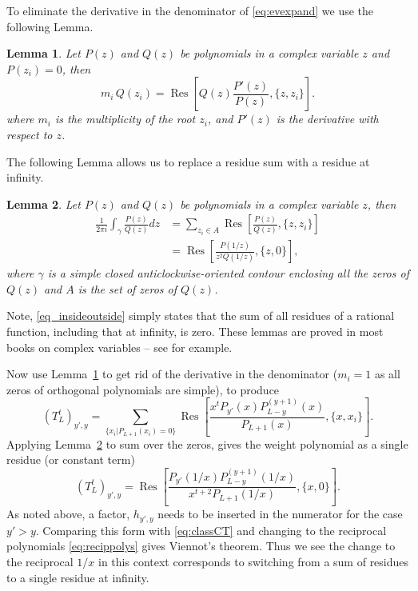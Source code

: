 \documentclass[11pt,a4paper]{article}
\DeclareMathOperator{\res}{\text{Res}}
\newtheorem{lemma}{Lemma}[section]
\begin{document}
To eliminate the derivative in the denominator of \eqref{eq:evexpand} we use the following Lemma.
\begin{lemma}  
\label{lem:asdasd}
Let $P(z)$ and $Q(z)$ be  polynomials in a complex variable $z$ and  $P(z_i)=0$, then 
\begin{equation}
	m_i\,	Q(z_i)= \res \left [ Q(z) \frac{P'(z)}{P(z)}, \{z, z_i\}\right ].
		\label{eq_zeroToRez}
\end{equation}
where $m_i$ is the multiplicity of the root $z_i$, and $P'(z)$ is the derivative with respect to $z$.
\end{lemma} 
%
The following Lemma allows us to replace a residue sum with a residue at infinity.
\begin{lemma}  
\label{lem:insideoutside}
Let $P(z)$ and $Q(z)$ be  polynomials in a complex variable $z$, then
\begin{subequations}
\begin{align}
	\frac{1}{2\pi i }\int_\gamma \frac{P(z)}{Q(z)}dz	&=	\sum_{z_i \in A} \res \left [ \frac{P(z)}{Q(z)}, \{z, z_i \}\right ]\\
		&=	 \res \left [\frac{P(1/z)}{z^2Q(1/z)}, \{z, 0\}\right ],
\end{align}		
\label{eq_insideoutside}
\end{subequations}
where $\gamma$ is a simple closed anticlockwise-oriented contour enclosing all the  zeros of $Q(z)$ and $A$ is the set of zeros of $Q(z)$. 
\end{lemma} 
%

Note, \eqref{eq_insideoutside} simply states that the sum of all residues of a rational function, including that at infinity, is zero.  These lemmas are proved in most books on complex variables -- see \cite{boas:1987lq} for example.


Now use Lemma~\ref{lem:asdasd} to get rid of the derivative in the denominator ($m_i=1$ as all zeros of orthogonal polynomials are simple), to produce
\begin{equation} 
(T_L^t)_{y',y} = \sum_{\{x_i |P_{L+1}(x_i)=0 \}} \res \left [ \frac{x^t P_{y'}(x)P^{(y+1)}_{L-y}(x)}{P_{L+1}(x)} , \{x, x_i\} \right].  
\end{equation}
Applying Lemma~\ref{lem:insideoutside}  to sum over the zeros, gives the weight polynomial as a single residue (or constant term)
\begin{equation}\label{eq:tmtxpower}
(T_L^t)_{y',y} = \res \left [ \frac{P_{y'}(1/x)P^{(y+1)}_{L-y}(1/x)}{x^{t+2}P_{L+1}(1/x)} , \{x, 0\} \right].
\end{equation}
As noted above, a factor, $h_{y',y}$ needs to be inserted in the numerator for the case $y'>y$. Comparing this form with \eqref{eq:classCT} and changing to the reciprocal polynomials \eqref{eq:recippolys} gives  Viennot's theorem. Thus we see the change to the reciprocal $1/x$  in this context   corresponds to switching from a sum of residues to a single residue at infinity.
\end{document}
